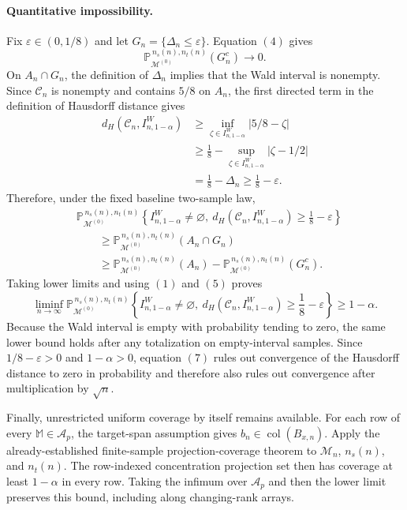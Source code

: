 \paragraph{Quantitative impossibility.}
Fix \(\varepsilon\in(0,1/8)\) and let
\(G_n=\{\Delta_n\le\varepsilon\}\). Equation \((4)\) gives
\[
\mathbb P_{\mathcal M^{(0)}}^{\,n_s(n),n_t(n)}(G_n^c)
\longrightarrow0. \tag{5}
\]
On \(A_n\cap G_n\), the definition of \(\Delta_n\) implies that the Wald interval is nonempty. Since \(\mathcal C_n\) is nonempty and contains \(5/8\) on \(A_n\), the first directed term in the definition of Hausdorff distance gives
\[
\begin{split}
d_H(\mathcal C_n,I^W_{n,1-\alpha})
&\ge
\inf_{\zeta\in I^W_{n,1-\alpha}}|5/8-\zeta|\\
&\ge
\frac18-
\sup_{\zeta\in I^W_{n,1-\alpha}}|\zeta-1/2|\\
&=\frac18-\Delta_n
\ge\frac18-\varepsilon.
\end{split}\tag{6}
\]
Therefore, under the fixed baseline two-sample law,
\[
\begin{split}
&\mathbb P_{\mathcal M^{(0)}}^{\,n_s(n),n_t(n)}
\left\{I^W_{n,1-\alpha}\ne\varnothing,\ 
d_H(\mathcal C_n,I^W_{n,1-\alpha})
\ge\frac18-\varepsilon\right\}\\
&\qquad\ge
\mathbb P_{\mathcal M^{(0)}}^{\,n_s(n),n_t(n)}(A_n\cap G_n)\\
&\qquad\ge
\mathbb P_{\mathcal M^{(0)}}^{\,n_s(n),n_t(n)}(A_n)
-
\mathbb P_{\mathcal M^{(0)}}^{\,n_s(n),n_t(n)}(G_n^c).
\end{split}
\]
Taking lower limits and using \((1)\) and \((5)\) proves
\[
\liminf_{n\to\infty}
\mathbb P_{\mathcal M^{(0)}}^{\,n_s(n),n_t(n)}
\left\{I^W_{n,1-\alpha}\ne\varnothing,\ 
d_H(\mathcal C_n,I^W_{n,1-\alpha})
\ge\frac18-\varepsilon\right\}
\ge1-\alpha. \tag{7}
\]
Because the Wald interval is empty with probability tending to zero, the same lower bound holds after any totalization on empty-interval samples. Since \(1/8-\varepsilon>0\) and \(1-\alpha>0\), equation \((7)\) rules out convergence of the Hausdorff distance to zero in probability and therefore also rules out convergence after multiplication by \(\sqrt n\).

Finally, unrestricted uniform coverage by itself remains available. For each row of every
\(\mathbb M\in\mathcal A_p\), the target-span assumption gives
\(b_n\in\operatorname{col}(B_{x,n})\). Apply the already-established finite-sample projection-coverage theorem to \(\mathcal M_n\), \(n_s(n)\), and \(n_t(n)\). The row-indexed concentration projection set then has coverage at least \(1-\alpha\) in every row. Taking the infimum over \(\mathcal A_p\) and then the lower limit preserves this bound, including along changing-rank arrays.
